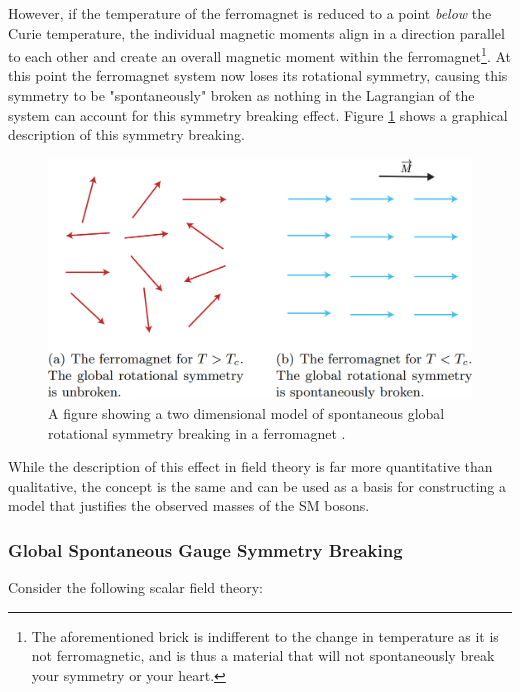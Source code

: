 \documentclass[12pt,a4paper,epsf,portrait,times,epsfig]{report}
\begin{document}
	However, if the temperature of the ferromagnet is reduced to a point \textit{below} the Curie temperature, the individual magnetic moments align in a direction parallel to each other and create an overall magnetic moment within the ferromagnet\footnote{The aforementioned brick is indifferent to the change in temperature as it is not ferromagnetic, and is thus a material that will not spontaneously break your symmetry or your heart.}. At this point the ferromagnet system now loses its rotational symmetry, causing this symmetry to be "spontaneously" broken as nothing in the Lagrangian of the system can account for this symmetry breaking effect. Figure \ref{Fig:SymmetryBreaking} shows a graphical description of this symmetry breaking. \par

	\begin{figure}[h]
		\centering
		\includegraphics[scale=0.3]{Spontaneous_Symmetry_Breaking_HQ.png}
		\caption{A figure showing a two dimensional model of spontaneous global rotational symmetry breaking in a ferromagnet \cite{2012SpontaneousSB}.}
		\label{Fig:SymmetryBreaking} 
	\end{figure}

	While the description of this effect in field theory is far more quantitative than qualitative, the concept is the same and can be used as a basis for constructing a model that justifies the observed masses of the SM bosons. \par 

	\subsubsection{Global Spontaneous Gauge Symmetry Breaking}

	Consider the following scalar field theory:
\end{document}
